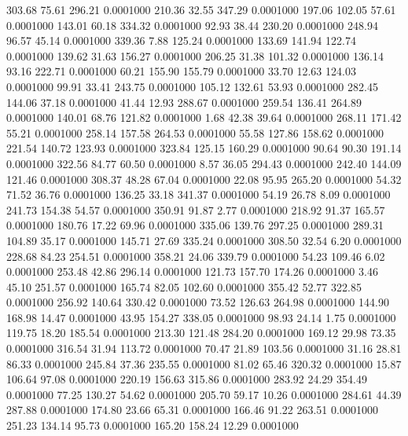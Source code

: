  303.68   75.61  296.21   0.0001000
 210.36   32.55  347.29   0.0001000
 197.06  102.05   57.61   0.0001000
 143.01   60.18  334.32   0.0001000
  92.93   38.44  230.20   0.0001000
 248.94   96.57   45.14   0.0001000
 339.36    7.88  125.24   0.0001000
 133.69  141.94  122.74   0.0001000
 139.62   31.63  156.27   0.0001000
 206.25   31.38  101.32   0.0001000
 136.14   93.16  222.71   0.0001000
  60.21  155.90  155.79   0.0001000
  33.70   12.63  124.03   0.0001000
  99.91   33.41  243.75   0.0001000
 105.12  132.61   53.93   0.0001000
 282.45  144.06   37.18   0.0001000
  41.44   12.93  288.67   0.0001000
 259.54  136.41  264.89   0.0001000
 140.01   68.76  121.82   0.0001000
   1.68   42.38   39.64   0.0001000
 268.11  171.42   55.21   0.0001000
 258.14  157.58  264.53   0.0001000
  55.58  127.86  158.62   0.0001000
 221.54  140.72  123.93   0.0001000
 323.84  125.15  160.29   0.0001000
  90.64   90.30  191.14   0.0001000
 322.56   84.77   60.50   0.0001000
   8.57   36.05  294.43   0.0001000
 242.40  144.09  121.46   0.0001000
 308.37   48.28   67.04   0.0001000
  22.08   95.95  265.20   0.0001000
  54.32   71.52   36.76   0.0001000
 136.25   33.18  341.37   0.0001000
  54.19   26.78    8.09   0.0001000
 241.73  154.38   54.57   0.0001000
 350.91   91.87    2.77   0.0001000
 218.92   91.37  165.57   0.0001000
 180.76   17.22   69.96   0.0001000
 335.06  139.76  297.25   0.0001000
 289.31  104.89   35.17   0.0001000
 145.71   27.69  335.24   0.0001000
 308.50   32.54    6.20   0.0001000
 228.68   84.23  254.51   0.0001000
 358.21   24.06  339.79   0.0001000
  54.23  109.46    6.02   0.0001000
 253.48   42.86  296.14   0.0001000
 121.73  157.70  174.26   0.0001000
   3.46   45.10  251.57   0.0001000
 165.74   82.05  102.60   0.0001000
 355.42   52.77  322.85   0.0001000
 256.92  140.64  330.42   0.0001000
  73.52  126.63  264.98   0.0001000
 144.90  168.98   14.47   0.0001000
  43.95  154.27  338.05   0.0001000
  98.93   24.14    1.75   0.0001000
 119.75   18.20  185.54   0.0001000
 213.30  121.48  284.20   0.0001000
 169.12   29.98   73.35   0.0001000
 316.54   31.94  113.72   0.0001000
  70.47   21.89  103.56   0.0001000
  31.16   28.81   86.33   0.0001000
 245.84   37.36  235.55   0.0001000
  81.02   65.46  320.32   0.0001000
  15.87  106.64   97.08   0.0001000
 220.19  156.63  315.86   0.0001000
 283.92   24.29  354.49   0.0001000
  77.25  130.27   54.62   0.0001000
 205.70   59.17   10.26   0.0001000
 284.61   44.39  287.88   0.0001000
 174.80   23.66   65.31   0.0001000
 166.46   91.22  263.51   0.0001000
 251.23  134.14   95.73   0.0001000
 165.20  158.24   12.29   0.0001000
